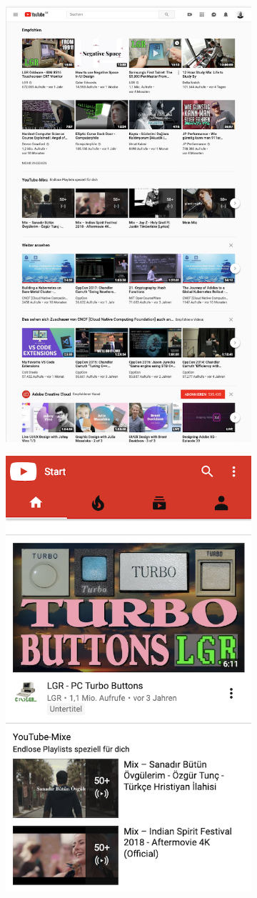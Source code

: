 \begin{figure}
	\begin{subfigure}{0.49\linewidth}
		\centering
		\includegraphics[width=0.5\linewidth]{resources/screenshot_resolution}
		\caption{}
		\label{compare_resolution}
	\end{subfigure}
	\begin{subfigure}{0.49\linewidth}
		\centering
		\includegraphics[width=0.5\linewidth]{resources/screenshot_resolutionanduseragent}

\end{subfigure}
\end{figure}

